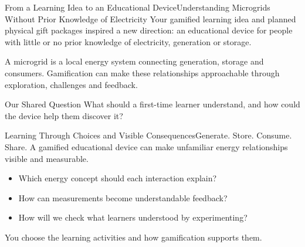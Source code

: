 \begin{frame}{From a Learning Idea to an Educational Device}{Understanding Microgrids Without Prior Knowledge of Electricity}
Your gamified learning idea and planned physical gift packages inspired a new direction: an educational device for people with little or no prior knowledge of electricity, generation or storage.
\begin{center}
\end{center}
A microgrid is a local energy system connecting generation, storage and consumers. Gamification can make these relationships approachable through exploration, challenges and feedback.
\begin{alertblock}{Our Shared Question}
What should a first-time learner understand, and how could the device help them discover it?
\end{alertblock}
\end{frame}

\begin{frame}{Learning Through Choices and Visible Consequences}{Generate. Store. Consume. Share.}
A gamified educational device can make unfamiliar energy relationships visible and measurable.
\begin{center}
\end{center}
\begin{itemize}
\item Which energy concept should each interaction explain?
\item How can measurements become understandable feedback?
\item How will we check what learners understood by experimenting?
\end{itemize}
\centering\alert{You choose the learning activities and how gamification supports them.}
\end{frame}

